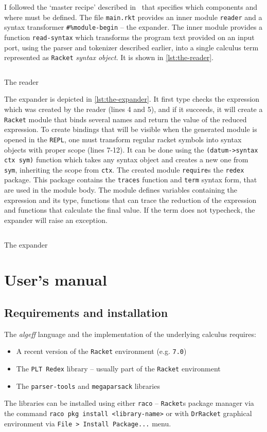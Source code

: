 \documentclass[inz, english, longabstract]{iithesis}
\newcommand{\Redex}{\texttt{PLT Redex}}
\newcommand{\Racket}{\texttt{Racket}}
\begin{document}
I followed the `master recipe' described in~\cite{BeautifulRacket} that specifies which components and where must be defined.
The file \texttt{main.rkt} provides an inner module \texttt{reader} and a syntax transformer \texttt{\#\%module-begin} -- the expander.
The inner module provides a function \texttt{read-syntax} which transforms the program text provided on an input port, using the parser and tokenizer described earlier, into a single calculus term represented as \Racket{} \emph{syntax object}.
It is shown in \autoref{lst:the-reader}.
\begin{listing}[t]
  \inputminted[firstline=11, lastline=19]{Racket}{../algeff/main.rkt}
  \caption{The reader}
  \label{lst:the-reader}
\end{listing}
The expander is depicted in \autoref{lst:the-expander}.
It first type checks the expression which was created by the reader (lines 4 and 5), and if it succeeds, it will create a \Racket{} module that binds several names and return the value of the reduced expression.
To create bindings that will be visible when the generated module is opened in the \texttt{REPL}, one must transform regular racket symbols into syntax objects with proper scope (lines 7-12).
It can be done using the \texttt{(datum->syntax ctx sym)} function which takes any syntax object and creates a new one from \texttt{sym}, inheriting the scope from \texttt{ctx}.
The created module \texttt{require}s the \texttt{redex} package.
This package contains the \texttt{traces} function and \texttt{term} syntax form, that are used in the module body.
The module defines variables containing the expression and its type, functions that can trace the reduction of the expression and functions that calculate the final value.
If the term does not typecheck, the expander will raise an exception.
\begin{listing}[t]
  \inputminted[firstline=29,linenos=true,firstnumber=1,lastline=57]{Racket}{../algeff/main.rkt}
  \caption{The expander}
  \label{lst:the-expander}
\end{listing}

\chapter{User's manual}\label{ch:manual}
\section{Requirements and installation}
The \emph{algeff} language and the implementation of the underlying calculus requires:
\begin{itemize}
  \item A recent version of the \Racket{} environment (e.g. \texttt{7.0})
  \item The \Redex{} library -- usually part of the \Racket{} environment
  \item The \texttt{parser-tools} and \texttt{megaparsack} libraries
\end{itemize}
The libraries can be installed using either \texttt{raco} -- \Racket{}s package manager via the command \texttt{raco pkg install <library-name>} or with \texttt{DrRacket} graphical environment via \texttt{File > Install Package...} menu.
\end{document}
